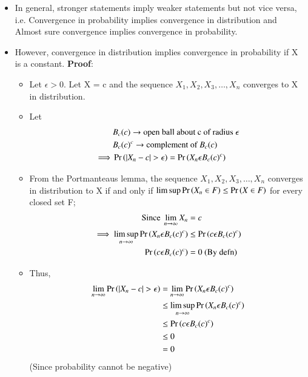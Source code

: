\documentclass[journal,12pt,twocolumn]{IEEEtran}
\begin{document}
\begin{itemize}
    \item In general, stronger statements imply weaker statements but not vice versa, i.e. Convergence in probability implies convergence in distribution and Almost sure convergence implies convergence in probability.\newline
    \item However, convergence in distribution implies convergence in probability if X is a constant.\newline
    \textbf{Proof}:
    \begin{itemize}
        \item Let $\epsilon > 0$. Let X = c and the sequence $X_1,X_2,X_3, \dots ,X_n$ converges to X in distribution.
        \item Let \begin{align}
            &B_c(c) \rightarrow \text{open ball about c of radius } \epsilon \\
            &B_c(c)^c \rightarrow \text{complement of } B_c(c) \\
            \implies &\pr{|X_n - c|>\epsilon} = \pr{X_ n\epsilon B_c(c)^c}
        \end{align}
        \item From the Portmanteaus lemma, the sequence $X_1,X_2,X_3, \dots ,X_n$ converges in distribution to X if and only if $ \limsup \Pr\left(X_{n}\in F\right) \leq \Pr\left(X\in F\right)$ for every closed set F; 
        \begin{align}
           \text{Since }\lim_{n \rightarrow \infty}X_n &= c \\
            \implies \limsup_{n \rightarrow \infty} \Pr\left(X_n \epsilon B_c(c)^c\right) &\leq  \Pr\left(c \epsilon B_c(c)^c\right) \\
            \Pr\left(c \epsilon B_c(c)^c\right) &= 0 \text{ (By defn)}
        \end{align}
        \item Thus,
        \begin{align}
            \lim_{n \rightarrow \infty}\pr{|X_n - c|>\epsilon} &= \lim_{n \rightarrow \infty}\pr{X_n \epsilon B_c(c)^c} \\
            & \leq \limsup_{n \rightarrow \infty}\pr{X_n \epsilon B_c(c)^c} \\
            &\leq \pr{c \epsilon B_c(c)^c} \\
            &\leq 0 \\
            &= 0 
        \end{align}
        (Since probability cannot be negative)

\end{itemize}
\end{itemize}
\end{document}
